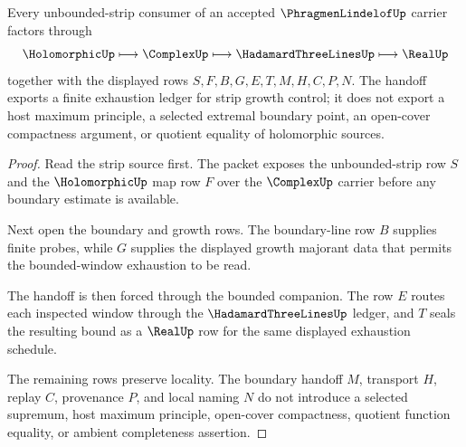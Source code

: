 \begin{theorem}
\label{thm:phragmen-lindelof-strip-boundary-handoff}
Every unbounded-strip consumer of an accepted $\PhragmenLindelofUp$ carrier factors through
$$
\HolomorphicUp \longmapsto \ComplexUp \longmapsto \HadamardThreeLinesUp \longmapsto \RealUp
$$
together with the displayed rows $S,F,B,G,E,T,M,H,C,P,N$. The handoff exports a finite exhaustion ledger for strip growth control; it does not export a host maximum principle, a selected extremal boundary point, an open-cover compactness argument, or quotient equality of holomorphic sources.
\end{theorem}
\begin{proof}
Read the strip source first. The packet exposes the unbounded-strip row $S$ and the $\HolomorphicUp$ map row $F$ over the $\ComplexUp$ carrier before any boundary estimate is available.

Next open the boundary and growth rows. The boundary-line row $B$ supplies finite probes, while $G$ supplies the displayed growth majorant data that permits the bounded-window exhaustion to be read.

The handoff is then forced through the bounded companion. The row $E$ routes each inspected window through the $\HadamardThreeLinesUp$ ledger, and $T$ seals the resulting bound as a $\RealUp$ row for the same displayed exhaustion schedule.

The remaining rows preserve locality. The boundary handoff $M$, transport $H$, replay $C$, provenance $P$, and local naming $N$ do not introduce a selected supremum, host maximum principle, open-cover compactness, quotient function equality, or ambient completeness assertion.
\end{proof}



